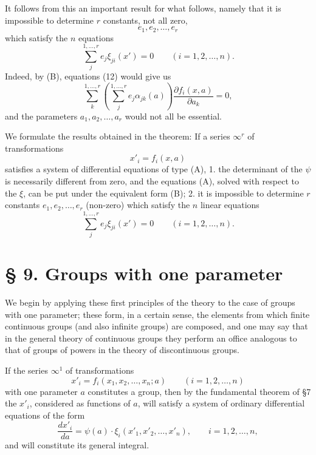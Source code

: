 \documentclass[11pt]{book}
\begin{document}
It follows from this an important result for what follows, namely that it is impossible to determine $r$ constants, not all zero,
\[
 e_1,e_2,\ldots,e_r
\]
which satisfy the $n$ equations
\begin{equation*}\tag{12}
 \sum\limits_j^{1,\ldots,r}e_j\xi_{ji}(x')=0\qquad (i=1,2,\ldots,n).
\end{equation*}
Indeed, by (B), equations (12) would give us
\[
 \sum\limits_k^{1,\ldots,r}\left(\sum\limits_j^{1,\ldots,r}e_j\alpha_{jk}(a)\right)
 \frac{\partial f_i(x,a)}{\partial a_k}=0,
\]
and the parameters $a_1,a_2,\ldots,a_r$ would not all be essential.

We formulate the results obtained in the theorem:
If a series $\infty^r$ of transformations
\[
 x'_i=f_i(x,a)
\]
satisfies a system of differential equations of type (A), 1. the determinant of the $\psi$ is necessarily different from zero, and the equations (A), solved with respect to the $\xi$, can be put under the equivalent form (B); 2. it is impossible to determine $r$ constants $e_1,e_2,\ldots,e_r$ (non-zero) which satisfy the $n$ linear equations
\[
 \sum\limits_j^{1,\ldots,r}e_j\xi_{ji}(x')=0\qquad (i=1,2,\ldots,n).
\]

\section*{\S{} 9. Groups with one parameter}

We begin by applying these first principles of the theory to the case of groups with one parameter; these form, in a certain sense, the elements from which finite continuous groups (and also infinite groups) are composed, and one may say that in the general theory of continuous groups they perform an office analogous to that of groups of powers in the theory of discontinuous groups.

If the series $\infty^1$ of transformations
\begin{equation*}\tag{13}
 x'_i=f_i(x_1,x_2,\ldots,x_n;a)\qquad (i=1,2,\ldots,n)
\end{equation*}
with one parameter $a$ constitutes a group, then by the fundamental theorem of \S{}7 the $x'_i$, considered as functions of $a$, will satisfy a system of ordinary differential equations of the form
\begin{equation*}\tag{14}
 \frac{dx'_i}{da}=\psi(a)\cdot \xi_i(x'_1,x'_2,\ldots,x'_n),
 \qquad i=1,2,\ldots,n,
\end{equation*}
and will constitute its general integral.
\end{document}
